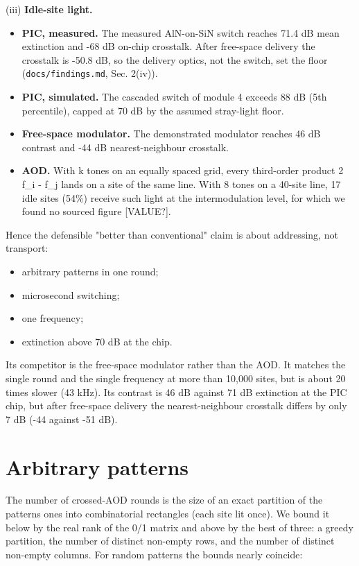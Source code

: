 (iii) \textbf{Idle-site light.}

\begin{itemize}
\tightlist
\item
  \textbf{PIC, measured.} The measured AlN-on-SiN switch reaches 71.4 dB
  mean extinction and -68 dB on-chip crosstalk. After free-space
  delivery the crosstalk is -50.8 dB, so the delivery optics, not the
  switch, set the floor (\texttt{docs/findings.md}, Sec. 2(iv)).
\item
  \textbf{PIC, simulated.} The cascaded switch of module 4 exceeds 88 dB
  (5th percentile), capped at 70 dB by the assumed stray-light floor.
\item
  \textbf{Free-space modulator.} The demonstrated modulator reaches 46
  dB contrast and -44 dB nearest-neighbour crosstalk.
\item
  \textbf{AOD.} With k tones on an equally spaced grid, every
  third-order product 2 f\_i - f\_j lands on a site of the same line.
  With 8 tones on a 40-site line, 17 idle sites (54\%) receive such
  light at the intermodulation level, for which we found no sourced
  figure {[}VALUE?{]}.
\end{itemize}

Hence the defensible "better than conventional" claim is about
addressing, not transport:

\begin{itemize}
\tightlist
\item
  arbitrary patterns in one round;
\item
  microsecond switching;
\item
  one frequency;
\item
  extinction above 70 dB at the chip.
\end{itemize}

Its competitor is the free-space modulator rather than the AOD. It
matches the single round and the single frequency at more than 10,000
sites, but is about 20 times slower (43 kHz). Its contrast is 46 dB
against 71 dB extinction at the PIC chip, but after free-space delivery
the nearest-neighbour crosstalk differs by only 7 dB (-44 against -51
dB).

\hypertarget{2-arbitrary-patterns}{%
\section{Arbitrary patterns}\label{addressing-2-arbitrary-patterns}}

The number of crossed-AOD rounds is the size of an exact partition of
the pattern\textquotesingle s ones into combinatorial rectangles (each
site lit once). We bound it below by the real rank of the 0/1 matrix and
above by the best of three: a greedy partition, the number of distinct
non-empty rows, and the number of distinct non-empty columns. For random
patterns the bounds nearly coincide:


